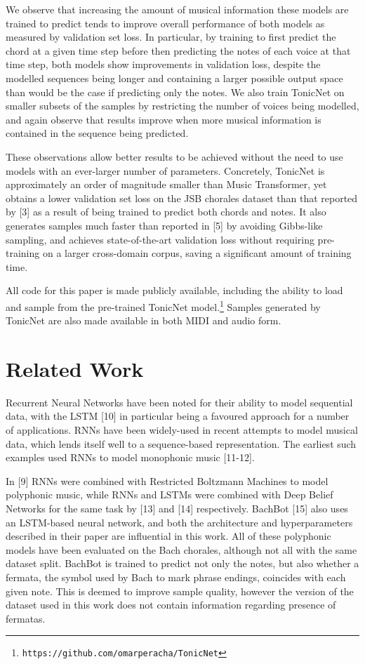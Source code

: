 \documentclass{article}
\begin{document}
We observe that increasing the amount of musical information these models are trained to predict tends to improve overall performance of both models as measured by validation set loss. In particular, by training to first predict the chord at a given time step before then predicting the notes of each voice at that time step, both models show improvements in validation loss, despite the modelled sequences being longer and containing a larger possible output space than would be the case if predicting only the notes. We also train TonicNet on smaller subsets of the samples by restricting the number of voices being modelled, and again observe that results improve when more musical information is contained in the sequence being predicted.

These observations allow better results to be achieved without the need to use models with an ever-larger number of parameters. Concretely, TonicNet is approximately an order of magnitude smaller than Music Transformer, yet obtains a lower validation set loss on the JSB chorales dataset than that reported by [3] as a result of being trained to predict both chords and notes. It also generates samples much faster than reported in [5] by avoiding Gibbs-like sampling, and achieves state-of-the-art validation loss without requiring pre-training on a larger cross-domain corpus, saving a significant amount of training time.

All code for this paper is made publicly available, including the ability to load and sample from the pre-trained TonicNet model.\footnote{ {\tt https://github.com/omarperacha/TonicNet} }
Samples generated by TonicNet are also made available in both MIDI and audio form.

\section{Related Work}
Recurrent Neural Networks have been noted for their ability to model sequential data, with the LSTM [10] in particular being a favoured approach for a number of applications. RNNs have been widely-used in recent attempts to model musical data, which lends itself well to a sequence-based representation. The earliest such examples used RNNs to model monophonic music [11-12].

In [9] RNNs were combined with Restricted Boltzmann Machines to model polyphonic music, while RNNs and LSTMs were combined with Deep Belief Networks for the same task by [13] and [14] respectively. BachBot [15] also uses an LSTM-based neural network, and both the architecture and hyperparameters described in their paper are influential in this work. All of these polyphonic models have been evaluated on the Bach chorales, although not all with the same dataset split. BachBot is trained to predict not only the notes, but also whether a fermata, the symbol used by Bach to mark phrase endings, coincides with each given note. This is deemed to improve sample quality, however the version of the dataset used in this work does not contain information regarding presence of fermatas.
\end{document}

